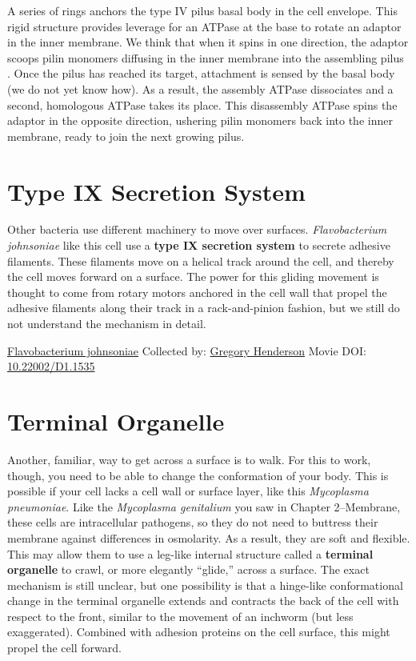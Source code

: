 \documentclass[]{tufte-book}
\begin{document}
A series of rings anchors the type IV pilus basal body in the cell envelope. This rigid structure provides leverage for an ATPase at the base to rotate an adaptor in the inner membrane. We think that when it spins in one direction, the adaptor scoops pilin monomers diffusing in the inner membrane into the assembling pilus \citep{chang2016}. Once the pilus has reached its target, attachment is sensed by the basal body (we do not yet know how). As a result, the assembly ATPase dissociates and a second, homologous ATPase takes its place. This disassembly ATPase spins the adaptor in the opposite direction, ushering pilin monomers back into the inner membrane, ready to join the next growing pilus.

\hypertarget{type-ix-secretion-system}{%
\section{Type IX Secretion System}\label{type-ix-secretion-system}}

Other bacteria use different machinery to move over surfaces. \emph{Flavobacterium johnsoniae} like this cell use a \textbf{type IX secretion system} to secrete adhesive filaments. These filaments move on a helical track around the cell, and thereby the cell moves forward on a surface. The power for this gliding movement is thought to come from rotary motors anchored in the cell wall that propel the adhesive filaments along their track in a rack-and-pinion fashion, but we still do not understand the mechanism in detail.



\hypertarget{htmlwidget-8a96872f9291a56b614d}{}

\label{fig:6-11}\protect\hyperlink{tree}{Flavobacterium johnsoniae} Collected by: \protect\hyperlink{gregory_henderson}{Gregory Henderson} Movie DOI: \href{https://doi.org/10.22002/D1.1535}{10.22002/D1.1535}

\hypertarget{terminal-organelle}{%
\section{Terminal Organelle}\label{terminal-organelle}}

Another, familiar, way to get across a surface is to walk. For this to work, though, you need to be able to change the conformation of your body. This is possible if your cell lacks a cell wall or surface layer, like this \emph{Mycoplasma pneumoniae}. Like the \emph{Mycoplasma genitalium} you saw in Chapter 2--Membrane, these cells are intracellular pathogens, so they do not need to buttress their membrane against differences in osmolarity. As a result, they are soft and flexible. This may allow them to use a leg-like internal structure called a \textbf{terminal organelle} to crawl, or more elegantly ``glide,'' across a surface. The exact mechanism is still unclear, but one possibility is that a hinge-like conformational change in the terminal organelle extends and contracts the back of the cell with respect to the front, similar to the movement of an inchworm (but less exaggerated). Combined with adhesion proteins on the cell surface, this might propel the cell forward.
\end{document}
